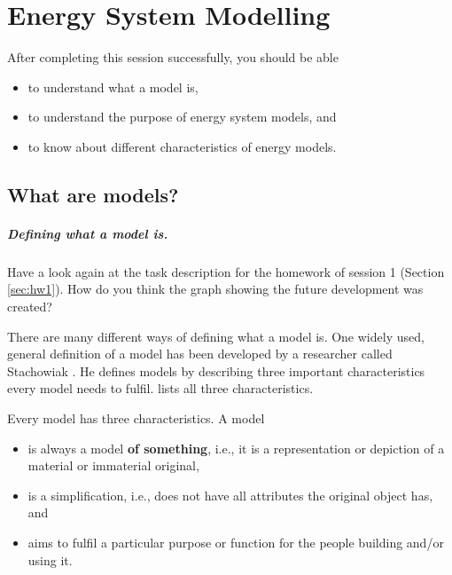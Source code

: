 \setchapterpreamble[u]{\margintoc}
\chapter{Energy System Modelling}


After completing this session successfully, you should be able

\begin{itemize}
\item to understand what a model is,
\item to understand the purpose of energy system models, and
\item to know about different characteristics of energy models.
\end{itemize}



\section{What are models?}


\paragraph*{Defining what a model is.}

\begin{kaobox}[frametitle=Task]
Have a look again at the task description for the homework of session 1 (Section \ref{sec:hw1}). How do you think the graph showing the future development was created?
\end{kaobox}


There are many different ways of defining what a model is. One widely used, general definition of a model has been developed by a researcher called Stachowiak . He defines models by describing three important characteristics every model needs to fulfil.  lists all three characteristics.

\begin{definition}
Every model has three characteristics. A model
\begin{itemize}
\item  is always a model \textbf{of something}, i.e., it is a representation or depiction of a material or immaterial original,
\item is a simplification, i.e., does not have all attributes the original object has, and
\item aims to fulfil a particular purpose or function for the people building and/or using it.
\end{itemize}
\end{definition}

